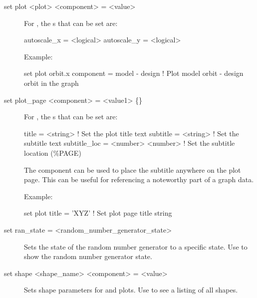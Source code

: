 {{\begin{description}

\item[set plot <plot> <component> = <value>] \Newline
For , the s that can be set are:
\begin{example}
  autoscale_x = <logical>
  autoscale_y = <logical>
\end{example}

Example:
\begin{example}
  set plot orbit.x component = model - design  
                          ! Plot model orbit - design orbit in the graph
\end{example}


\item[set plot\_page <component> = <value1> \{<value2>\}] \Newline
For , the s that can be set are:
\begin{example}
  title        = <string>          ! Set the plot title text
  subtitle     = <string>          ! Set the subtitle text
  subtitle_loc = <number> <number> ! Set the subtitle location (\%PAGE)
\end{example}
The  component can be used to place the subtitle anywhere on
the plot page. This can be useful for referencing a noteworthy part of a graph
data.

Example:
\begin{example}
  set plot title = 'XYZ'  ! Set plot page title string
\end{example}


\item[set ran\_state = <random_number_generator_state>] \Newline

Sets the state of the random number generator to a specific state. Use
 to show the random number generator state.


\item[set shape <shape_name> <component> = <value>] \Newline

Sets shape parameters for  and  plots.
Use  to see a listing of all shapes. 


\end{description}}}

